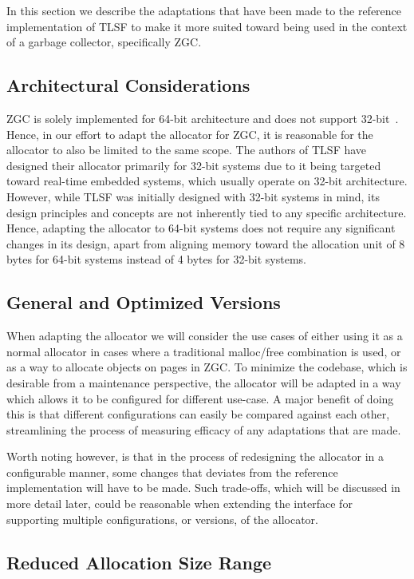 In this section we describe the adaptations that have been made to the reference implementation of TLSF to make it more suited toward being used in the context of a garbage collector, specifically ZGC.

\subsection{Architectural Considerations}

ZGC is solely implemented for 64-bit architecture and does not support 32-bit~\cite{zgc_deep_dive}. Hence, in our effort to adapt the allocator for ZGC, it is reasonable for the allocator to also be limited to the same scope. The authors of TLSF have designed their allocator primarily for 32-bit systems due to it being targeted toward real-time embedded systems, which usually operate on 32-bit architecture. However, while TLSF was initially designed with 32-bit systems in mind, its design principles and concepts are not inherently tied to any specific architecture. Hence, adapting the allocator to 64-bit systems does not require any significant changes in its design, apart from aligning memory toward the allocation unit of 8 bytes for 64-bit systems instead of 4 bytes for 32-bit systems.

\subsection{General and Optimized Versions}

When adapting the allocator we will consider the use cases of either using it as a normal allocator in cases where a traditional malloc/free combination is used, or as a way to allocate objects on pages in ZGC. To minimize the codebase, which is desirable from a maintenance perspective, the allocator will be adapted in a way which allows it to be configured for different use-case. A major benefit of doing this is that different configurations can easily be compared against each other, streamlining the process of measuring efficacy of any adaptations that are made.

Worth noting however, is that in the process of redesigning the allocator in a configurable manner, some changes that deviates from the reference implementation will have to be made. Such trade-offs, which will be discussed in more detail later, could be reasonable when extending the interface for supporting multiple configurations, or versions, of the allocator.

\subsection{Reduced Allocation Size Range}

